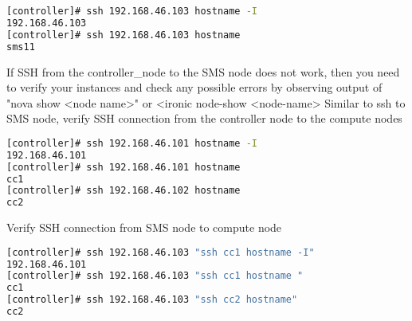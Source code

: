\begin{lstlisting}[language=bash,keywords={},upquote=true]
[controller]# ssh 192.168.46.103 hostname -I
192.168.46.103
[controller]# ssh 192.168.46.103 hostname 
sms11
\end{lstlisting}
If SSH from the controller\_node to the SMS node does not work, then you need to verify your instances and check any possible errors by observing output of "nova show <node name>" or <ironic node-show <node-name>
Similar to ssh to SMS node, verify SSH connection from the controller node to the compute nodes
\begin{lstlisting}[language=bash,keywords={},upquote=true]
[controller]# ssh 192.168.46.101 hostname -I
192.168.46.101
[controller]# ssh 192.168.46.101 hostname 
cc1
[controller]# ssh 192.168.46.102 hostname
cc2
\end{lstlisting}
Verify SSH connection from SMS node to compute node
\begin{lstlisting}[language=bash,keywords={},upquote=true]
[controller]# ssh 192.168.46.103 "ssh cc1 hostname -I"
192.168.46.101
[controller]# ssh 192.168.46.103 "ssh cc1 hostname "
cc1
[controller]# ssh 192.168.46.103 "ssh cc2 hostname" 
cc2
\end{lstlisting}
	
